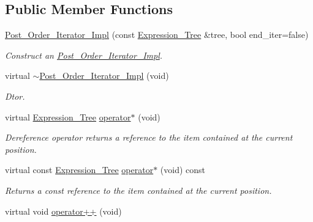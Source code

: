 \subsection*{Public Member Functions}
\begin{DoxyCompactItemize}
\item 
\hyperlink{classMadara_1_1Expression__Tree_1_1Post__Order__Iterator__Impl_a518a87569ec26d1ede774459b0f0868f}{Post\_\-Order\_\-Iterator\_\-Impl} (const \hyperlink{classMadara_1_1Expression__Tree_1_1Expression__Tree}{Expression\_\-Tree} \&tree, bool end\_\-iter=false)
\begin{DoxyCompactList}\small\item\em Construct an \hyperlink{classMadara_1_1Expression__Tree_1_1Post__Order__Iterator__Impl}{Post\_\-Order\_\-Iterator\_\-Impl}. \item\end{DoxyCompactList}\item 
virtual \hyperlink{classMadara_1_1Expression__Tree_1_1Post__Order__Iterator__Impl_a4602cffffbbf2bdad0f765e2f15dd2f0}{$\sim$Post\_\-Order\_\-Iterator\_\-Impl} (void)
\begin{DoxyCompactList}\small\item\em Dtor. \item\end{DoxyCompactList}\item 
virtual \hyperlink{classMadara_1_1Expression__Tree_1_1Expression__Tree}{Expression\_\-Tree} \hyperlink{classMadara_1_1Expression__Tree_1_1Post__Order__Iterator__Impl_a52bf5e8fc82ab5fff162d7f94f411d59}{operator$\ast$} (void)
\begin{DoxyCompactList}\small\item\em Dereference operator returns a reference to the item contained at the current position. \item\end{DoxyCompactList}\item 
virtual const \hyperlink{classMadara_1_1Expression__Tree_1_1Expression__Tree}{Expression\_\-Tree} \hyperlink{classMadara_1_1Expression__Tree_1_1Post__Order__Iterator__Impl_a353bc35186465b3df77ae126ac28a5b5}{operator$\ast$} (void) const 
\begin{DoxyCompactList}\small\item\em Returns a const reference to the item contained at the current position. \item\end{DoxyCompactList}\item 
virtual void \hyperlink{classMadara_1_1Expression__Tree_1_1Post__Order__Iterator__Impl_a8fb182a812c3184d0a68a8d5d23060ee}{operator++} (void)

\end{DoxyCompactItemize}
